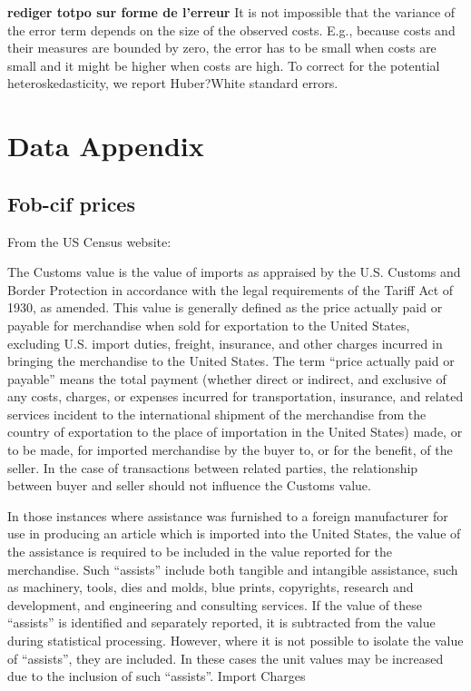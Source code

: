 \documentclass[a4paper,11pt]{article}
\begin{document}
\bigskip
\textbf{rediger totpo sur forme de l'erreur}
It is not impossible that the variance of the error term depends on the size of the observed costs. E.g., because costs and their measures are bounded by zero, the error has to be small when costs are small and it might be higher when costs are high. To correct for the potential heteroskedasticity, we report Huber?White standard errors.  




\appendix

\section{Data Appendix \label{app:data}}

\subsection{Fob-cif prices}
From the US Census website:

The Customs value is the value of imports as appraised by the U.S. Customs and Border Protection in accordance with the legal requirements of the Tariff Act of 1930, as amended. This value is generally defined as the price actually paid or payable for merchandise when sold for exportation to the United States, excluding U.S. import duties, freight, insurance, and other charges incurred in bringing the merchandise to the United States. The term ``price actually paid or payable'' means the total payment (whether direct or indirect, and exclusive of any costs, charges, or expenses incurred for transportation, insurance, and related services incident to the international shipment of the merchandise from the country of exportation to the place of importation in the United States) made, or to be made, for imported merchandise by the buyer to, or for the benefit, of the seller. In the case of transactions between related parties, the relationship between buyer and seller should not influence the Customs value.

In those instances where assistance was furnished to a foreign manufacturer for use in producing an article which is imported into the United States, the value of the assistance is required to be included in the value reported for the merchandise. Such ``assists'' include both tangible and intangible assistance, such as machinery, tools, dies and molds, blue prints, copyrights, research and development, and engineering and consulting services. If the value of these ``assists'' is identified and separately reported, it is subtracted from the value during statistical processing. However, where it is not possible to isolate the value of ``assists'', they are included. In these cases the unit values may be increased due to the inclusion of such ``assists''.
Import Charges
\end{document}
